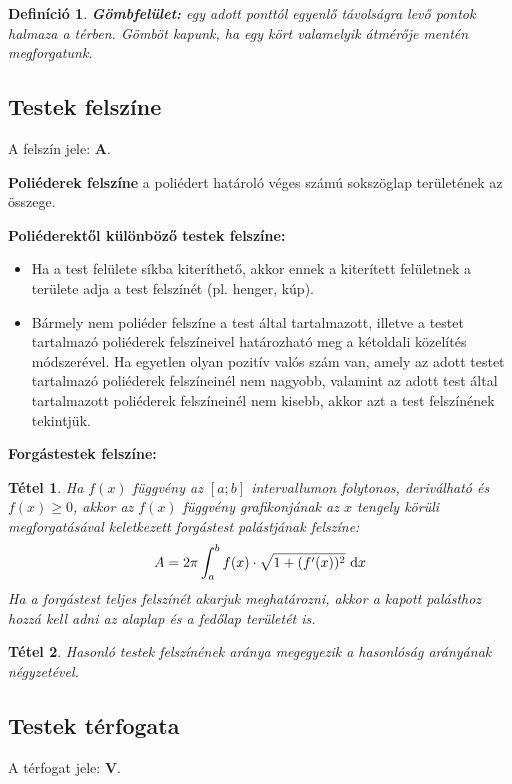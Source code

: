 \documentclass[12pt,a4paper]{article}
\newtheorem{theorem}{Tétel} [section]
\newtheorem{definition}{Definíció} [section]
\begin{document}
\begin{definition}
\textbf{Gömbfelület:} egy adott ponttól egyenlő távolságra levő pontok halmaza a térben. Gömböt kapunk, ha egy kört valamelyik átmérője mentén megforgatunk.
\end{definition}

\subsection{Testek felszíne}
A felszín jele: \textbf{A}.

\textbf{Poliéderek felszíne} a poliédert határoló véges számú sokszöglap területének az összege.

\textbf{Poliéderektől különböző testek felszíne:}
\begin{itemize}
\item Ha a test felülete síkba kiteríthető, akkor ennek a kiterített felületnek a területe adja a test felszínét (pl. henger, kúp).
\item Bármely nem poliéder felszíne a test által tartalmazott, illetve a testet tartalmazó poliéderek felszíneivel határozható meg a kétoldali közelítés módszerével. Ha egyetlen olyan pozitív valós szám van, amely az adott testet tartalmazó poliéderek felszíneinél nem nagyobb, valamint az adott test által tartalmazott poliéderek felszíneinél nem kisebb, akkor azt a test felszínének tekintjük.
\end{itemize}

\textbf{Forgástestek felszíne:}

\begin{theorem}
Ha $f(x)$ függvény az $[a; b]$ intervallumon folytonos, deriválható és $f(x) \geq 0$, akkor az $f(x)$ függvény grafikonjának az $x$ tengely körüli megforgatásával keletkezett forgástest palástjának felszíne:
$$A=2\pi\int_a^bf(x)\cdot \sqrt{1+(f'(x))^2}{\normalfont\text{ d}}x$$
Ha a forgástest teljes felszínét akarjuk meghatározni, akkor a kapott palásthoz hozzá kell adni az alaplap és a fedőlap területét is.
\end{theorem}
\begin{theorem}
Hasonló testek felszínének aránya megegyezik a hasonlóság arányának négyzetével.
\end{theorem}

\subsection{Testek térfogata}
A térfogat jele: \textbf{V}.
\end{document}
